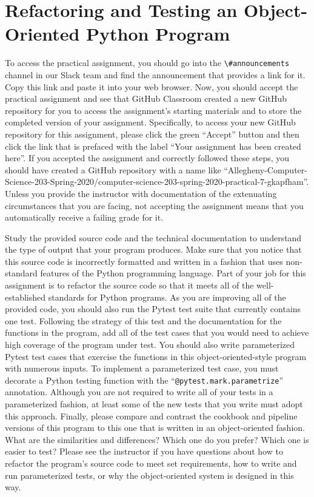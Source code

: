 \documentclass[11pt]{article}
\newcommand{\command}[1]{``\lstinline{#1}''}
\newcommand{\channel}[1]{\lstinline{#1}}
\begin{document}
\section*{Refactoring and Testing an Object-Oriented Python Program}

To access the practical assignment, you should go into the
\channel{\#announcements} channel in our Slack team and find the announcement
that provides a link for it. Copy this link and paste it into your web browser.
Now, you should accept the practical assignment and see that GitHub Classroom
created a new GitHub repository for you to access the assignment's starting
materials and to store the completed version of your assignment. Specifically,
to access your new GitHub repository for this assignment, please click the green
``Accept'' button and then click the link that is prefaced with the label ``Your
assignment has been created here''. If you accepted the assignment and correctly
followed these steps, you should have created a GitHub repository with a name
like
``Allegheny-Computer-Science-203-Spring-2020/computer-science-203-spring-2020-practical-7-gkapfham''.
Unless you provide the instructor with documentation of the extenuating
circumstances that you are facing, not accepting the assignment means that you
automatically receive a failing grade for it.

Study the provided source code and the technical documentation to understand the
type of output that your program produces.
%
Make sure that you notice that this source code is incorrectly formatted and
written in a fashion that uses non-standard features of the Python programming
language.
%
Part of your job for this assignment is to refactor the source code so that it
meets all of the well-established standards for Python programs.
%
As you are improving all of the provided code, you should also run the Pytest
test suite that currently contains one test. Following the strategy of this test
and the documentation for the functions in the program, add all of the test
cases that you would need to achieve high coverage of the program under test.
%
You should also write parameterized Pytest test cases that exercise the
functions in this object-oriented-style program with numerous inputs. To
implement a parameterized test case, you must decorate a Python testing function
with the \command{@pytest.mark.parametrize} annotation.
%
Although you are not required to write all of your tests in a parameterized
fashion, at least some of the new tests that you write must adopt this approach.
%
Finally, please compare and contrast the cookbook and pipeline versions of this
program to this one that is written in an object-oriented fashion. What are the
similarities and differences? Which one do you prefer? Which one is easier to
test?
%
Please see the instructor if you have questions about how to refactor the
program's source code to meet set requirements, how to write and run
parameterized tests, or why the object-oriented system is designed in this way.
\end{document}
